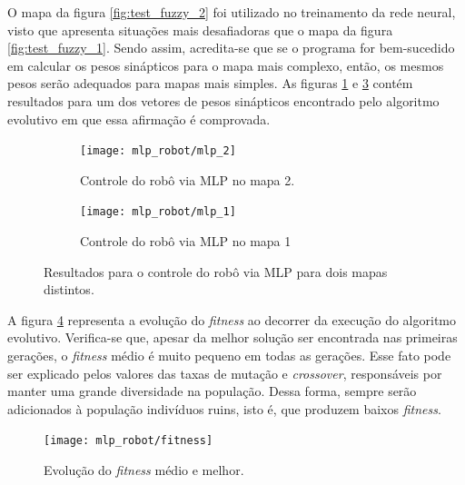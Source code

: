 O mapa da figura \ref{fig:test_fuzzy_2} foi utilizado no treinamento da rede
neural, visto que apresenta situações mais desafiadoras que o mapa da figura
\ref{fig:test_fuzzy_1}. Sendo assim, acredita-se que se o programa for
bem-sucedido em calcular os pesos sinápticos para o mapa mais complexo, então,
os mesmos pesos serão adequados para mapas mais simples. As figuras
\ref{fig:mlp_2} e \ref{fig:mlp_1} contém resultados para um dos vetores de
pesos sinápticos encontrado pelo algoritmo evolutivo em que essa afirmação é
comprovada.

\FloatBarrier
			    
	\begin{figure}[h!]
	
	\centering
	
		\begin{subfigure}{.5\textwidth}
		  \centering
		  \texttt{[image: mlp\_robot/mlp\_2]}
		  \caption{\centering Controle do robô via MLP no mapa 2.}
		  \label{fig:mlp_2}
		  
		\end{subfigure}%
		\begin{subfigure}{.5\textwidth}
		  \centering
		  \texttt{[image: mlp\_robot/mlp\_1]}
		  \caption{\centering Controle do robô via MLP no mapa 1}
		  \label{fig:mlp_1} 
		\end{subfigure}
	
	
	\caption{Resultados para o controle do robô via MLP
	para dois mapas distintos.}
	\end{figure} 
	
	\FloatBarrier
	
	A figura \ref{fig:fitness_mlp} representa a evolução do \textit{fitness} ao
	decorrer da execução do algoritmo evolutivo. Verifica-se que, apesar da melhor
	solução ser encontrada nas primeiras gerações, o \textit{fitness} médio é muito
	pequeno em todas as gerações. Esse fato pode ser explicado pelos valores das
	taxas de mutação e \textit{crossover}, responsáveis por manter uma grande
	diversidade na população. Dessa forma, sempre serão adicionados à população
	indivíduos ruins, isto é, que produzem baixos \textit{fitness}.
	
	\FloatBarrier
	
	\begin{figure}[h]
    \centering
    \texttt{[image: mlp\_robot/fitness]}
    \caption{\label{fig:fitness_mlp}Evolução do \textit{fitness} médio e
    melhor.}
	\end{figure}  
	
	\FloatBarrier
	

